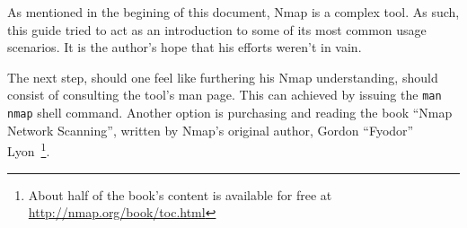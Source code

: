 \documentclass[a4paper,oneside,12pt]{book}
\begin{document}
As mentioned in the begining of this document, Nmap is a complex tool. As such, this guide tried to act as an introduction to some of its most common usage scenarios. It is the author's hope that his efforts weren't in vain.

The next step, should one feel like furthering his Nmap understanding, should consist of consulting the tool's man page. This can achieved by issuing the \texttt{man nmap} shell command. Another option is purchasing and reading the book ``Nmap Network Scanning'', written by Nmap's original author, Gordon ``Fyodor'' Lyon~\footnote{About half of the book's content is available for free at \url{http://nmap.org/book/toc.html}}.
\end{document}
